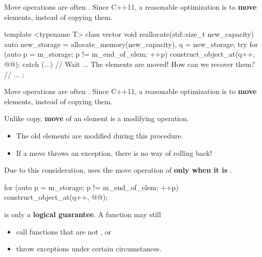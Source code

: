 \documentclass[aspectratio=169]{beamer}
\begin{document}
\begin{frame}[fragile]{Move operations are often .}
  Since C++11, a reasonable optimization is to \textbf{move} elements, instead of copying them.
  \begin{cpp}
    template <typename T>
    class vector {
      void reallocate(std::size_t new_capacity) {
        auto new_storage = allocate_memory(new_capacity), q = new_storage;
        try {
          for (auto p = m_storage; p != m_end_of_elem; ++p)
            construct_object_at(q++, @@);
        } catch (...) {
          // Wait ... The elements are moved! How can we recover them?
        }
        // ...
      }
    };
  \end{cpp}
\end{frame}

\begin{frame}[fragile]{Move operations are often .}
  Since C++11, a reasonable optimization is to \textbf{move} elements, instead of copying them.

  Unlike copy, \textbf{move} of an element is a modifying operation.
  \begin{itemize}
    \item The old elements are modified during this procedure.
    \item If a move throws an exception, there is no way of rolling back!
  \end{itemize}

  Due to this consideration,  uses the move operation of  \textbf{only when it is }.
  \begin{cpp}
    for (auto p = m_storage; p != m_end_of_elem; ++p)
      construct_object_at(q++, @@);
  \end{cpp}
\end{frame}

\begin{frame}{}
   is only a \textbf{logical guarantee}. A  function may still
  \begin{itemize}
    \item call functions that are not , or
    \item throw exceptions under certain circumstances.
  \end{itemize}
\end{frame}
\end{document}
